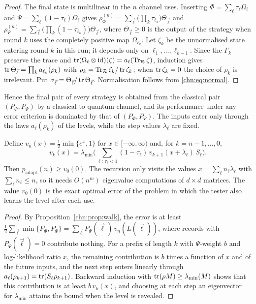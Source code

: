 \begin{proof}
The final state is multilinear in the $n$ channel uses. Inserting $\Phi=\sum_\ell\tau_\ell\Omega_\ell$ and $\Psi=\sum_\ell(1-\tau_\ell)\Omega_\ell$ gives $\rho^{(n)}_\Phi=\sum_{\vec\ell}\big(\prod_k\tau_{\ell_k}\big)\Theta_{\vec\ell}$ and $\rho^{(n)}_\Psi=\sum_{\vec\ell}\big(\prod_k(1-\tau_{\ell_k})\big)\Theta_{\vec\ell}$, where $\Theta_{\vec\ell}\ge0$ is the output of the strategy when round $k$ uses the completely positive map $\Omega_{\ell_k}$. Let $\zeta_k$ be the unnormalised state entering round $k$ in this run; it depends only on $\ell_1,\dots,\ell_{k-1}$. Since the $\Gamma_k$ preserve the trace and $\operatorname{tr}(\Omega_\ell\otimes\mathrm{id})(\zeta)=a_\ell(\operatorname{Tr}_{\mathcal R}\zeta)$, induction gives $\operatorname{tr}\Theta_{\vec\ell}=\prod_ka_{\ell_k}(\rho_k)$ with $\rho_k=\operatorname{Tr}_{\mathcal R}\zeta_k/\operatorname{tr}\zeta_k$; when $\operatorname{tr}\zeta_k=0$ the choice of $\rho_k$ is irrelevant. Put $\sigma_{\vec\ell}=\Theta_{\vec\ell}/\operatorname{tr}\Theta_{\vec\ell}$. Normalisation follows from \eqref{chn:eq:normal}.
\end{proof}

Hence the final pair of every strategy is obtained from the classical pair $(P_\Phi,P_\Psi)$ by a classical-to-quantum channel, and its performance under any error criterion is dominated by that of $(P_\Phi,P_\Psi)$. The inputs enter only through the laws $a_\ell(\rho_k)$ of the levels, while the step values $\lambda_\ell$ are fixed.

\begin{corollary}\label{chn:cor:dp}
Define $v_n(x)=\tfrac12\min\{e^x,1\}$ for $x\in[-\infty,\infty)$ and, for $k=n-1,\dots,0$,
\[
v_k(x)=\lambda_{\min}\Big(\sum_{\ell:\,\tau_\ell<1}(1-\tau_\ell)\,v_{k+1}(x+\lambda_\ell)\,S_\ell\Big).
\]
Then $p_{\mathrm{adapt}}(n)\ge v_0(0)$. The recursion only visits the values $x=\sum_\ell n_\ell\lambda_\ell$ with $\sum_\ell n_\ell\le n$, so it needs $O(n^m)$ eigenvalue computations of $d\times d$ matrices. The value $v_0(0)$ is the exact optimal error of the problem in which the tester also learns the level after each use.
\end{corollary}

\begin{proof}
By Proposition~\ref{chn:prop:walk}, the error is at least $\tfrac12\sum_{\vec\ell}\min\{P_\Phi,P_\Psi\}=\sum_{\vec\ell}P_\Psi(\vec\ell)\,v_n(L(\vec\ell))$, where records with $P_\Psi(\vec\ell)=0$ contribute nothing. For a prefix of length $k$ with $\Psi$-weight $b$ and log-likelihood ratio $x$, the remaining contribution is $b$ times a function of $x$ and of the future inputs, and the next step enters linearly through $a_\ell(\rho_{k+1})=\operatorname{tr}(S_\ell\rho_{k+1})$. Backward induction with $\operatorname{tr}(\rho M)\ge\lambda_{\min}(M)$ shows that this contribution is at least $b\,v_k(x)$, and choosing at each step an eigenvector for $\lambda_{\min}$ attains the bound when the level is revealed.
\end{proof}


